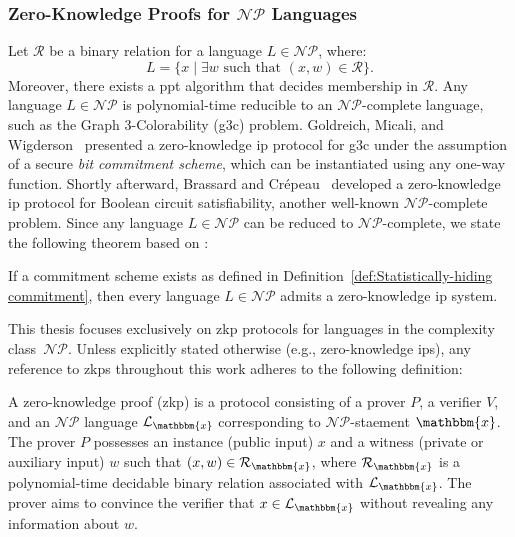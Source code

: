 \subsubsection{Zero-Knowledge Proofs for \texorpdfstring{$\mathcal{NP}$}{NP} Languages}
Let $\mathcal{R}$ be a binary relation for a language $L \in \mathcal{NP}$, where:
\[
L = \{x \mid \exists w \text{ such that } (x, w) \in \mathcal{R} \}.
\]
Moreover, there exists a \gls{ppt} algorithm that decides membership in $\mathcal{R}$. Any language $L \in \mathcal{NP}$ is polynomial-time reducible to an $\mathcal{NP}$-complete language, such as the Graph 3-Colorability (\gls{g3c}) problem. Goldreich, Micali, and Wigderson~\cite{Goldreich1991zk-np} presented a zero-knowledge \gls{ip} protocol for \gls{g3c} under the assumption of a secure \textit{bit commitment scheme}, which can be instantiated using any one-way function.  Shortly afterward, Brassard and Crépeau~\cite{Brassard1986ZKBoolean} developed a zero-knowledge \gls{ip} protocol for Boolean circuit satisfiability, another well-known $\mathcal{NP}$-complete problem. Since any language $L \in \mathcal{NP}$ can be reduced to $\mathcal{NP}$-complete, we state the following theorem based on \cite[Theorem 4.4.11]{Goldreich2001Book}:

\begin{theorem}
	If a commitment scheme exists as defined in Definition~\ref{def:Statistically-hiding commitment}, then every language $L \in \mathcal{NP}$ admits a zero-knowledge \gls{ip} system.
\end{theorem}

This thesis focuses exclusively on \gls{zkp} protocols for languages in the complexity class~$\mathcal{NP}$. Unless explicitly stated otherwise (e.g., zero-knowledge \glspl{ip}), any reference to \glspl{zkp} throughout this work adheres to the following definition:


\begin{definition}
	\label{def:Zero-knowledge Proof}	
	A zero-knowledge proof (\gls{zkp}) is a protocol consisting of a prover $P$, a verifier $V$, and an $\mathcal{NP}$ language $\mathcal{L}_\mathbbm{x}$ corresponding to $\mathcal{NP}$-staement $\mathbbm{x}$. The prover $P$ possesses an instance (public input) $x$ and a witness (private or auxiliary input) $w$ such that $(x, w) \in \mathcal{R}_\mathbbm{x}$, where $\mathcal{R}_\mathbbm{x}$ is a polynomial-time decidable binary relation associated with $\mathcal{L}_\mathbbm{x}$. The prover aims to convince the verifier that $x \in \mathcal{L}_\mathbbm{x}$ without revealing any information about $w$.
\end{definition}


